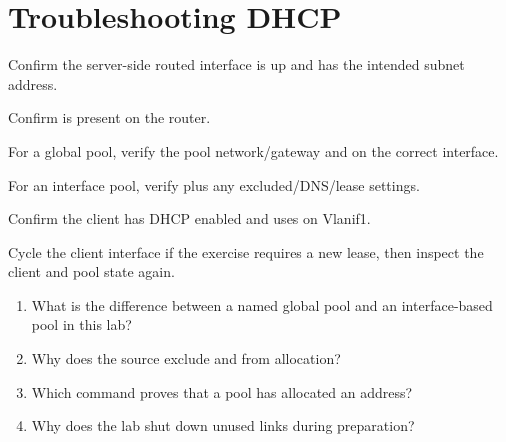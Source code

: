 \section{Troubleshooting DHCP}
\begin{utpsteps}
\item Confirm the server-side routed interface is up and has the intended subnet address.
\item Confirm  is present on the router.
\item For a global pool, verify the pool network/gateway and  on the correct interface.
\item For an interface pool, verify  plus any excluded/DNS/lease settings.
\item Confirm the client has DHCP enabled and uses  on Vlanif1.
\item Cycle the client interface if the exercise requires a new lease, then inspect the client and pool state again.
\end{utpsteps}

\begin{quickcheck}
\begin{enumerate}
\item What is the difference between a named global pool and an interface-based pool in this lab?
\item Why does the source exclude  and  from allocation?
\item Which command proves that a pool has allocated an address?
\item Why does the lab shut down unused links during preparation?
\end{enumerate}
\end{quickcheck}

